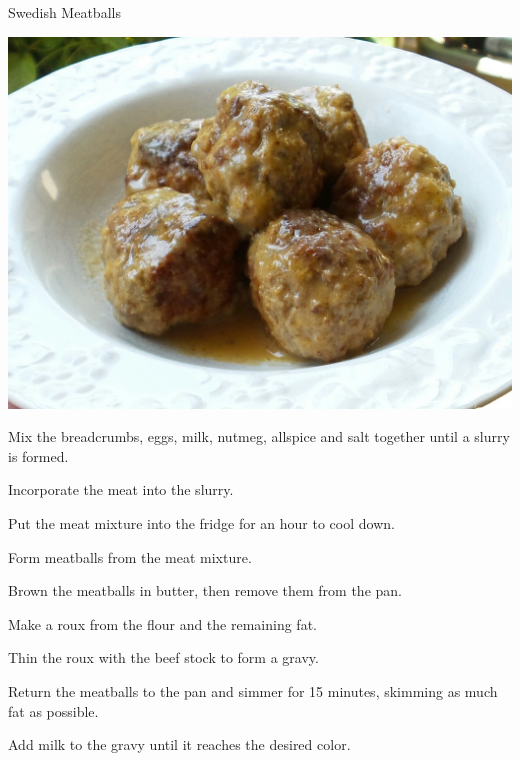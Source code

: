 \documentclass{recipe}
\begin{document}
\begin{recipe}{Swedish Meatballs}

  \begin{ingredients}
  \end{ingredients}

  \begin{images}
    \begin{image}
      \includegraphics[width=\linewidth,trim=0px 0px 0px 0px, clip=true]{swedish_meatballs-01.jpeg}
    \end{image}
  \end{images}

  \begin{steps}
  \item Mix the breadcrumbs, eggs, milk, nutmeg, allspice and salt
    together until a slurry is formed.
  \item Incorporate the meat into the slurry.
  \item Put the meat mixture into the fridge for an hour to cool down.
  \item Form meatballs from the meat mixture.
  \item Brown the meatballs in butter, then remove them from the pan.
  \item Make a roux from the flour and the remaining fat.
  \item Thin the roux with the beef stock to form a gravy.
  \item Return the meatballs to the pan and simmer for 15 minutes,
    skimming as much fat as possible.
  \item Add milk to the gravy until it reaches the desired color.
  \end{steps}


\end{recipe}
\end{document}
